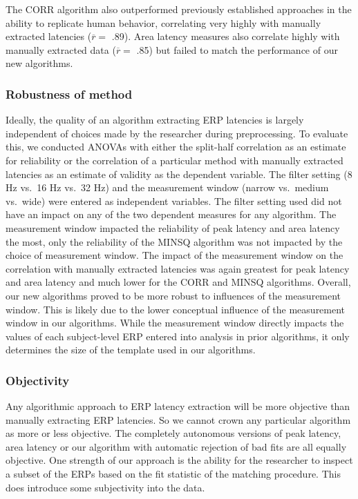 \documentclass[
  man,floatsintext]{apa7}
\begin{document}
The CORR algorithm also outperformed previously established approaches in the ability to replicate human behavior, correlating very highly with manually extracted latencies (\(\overline{r} =\) .89). Area latency measures also correlate highly with manually extracted data (\(\overline{r} =\) .85) but failed to match the performance of our new algorithms.

\hypertarget{robustness-of-method}{%
\subsubsection{Robustness of method}\label{robustness-of-method}}

Ideally, the quality of an algorithm extracting ERP latencies is largely independent of choices made by the researcher during preprocessing. To evaluate this, we conducted ANOVAs with either the split-half correlation as an estimate for reliability or the correlation of a particular method with manually extracted latencies as an estimate of validity as the dependent variable. The filter setting (8 Hz vs.~16 Hz vs.~32 Hz) and the measurement window (narrow vs.~medium vs.~wide) were entered as independent variables. The filter setting used did not have an impact on any of the two dependent measures for any algorithm. The measurement window impacted the reliability of peak latency and area latency the most, only the reliability of the MINSQ algorithm was not impacted by the choice of measurement window. The impact of the measurement window on the correlation with manually extracted latencies was again greatest for peak latency and area latency and much lower for the CORR and MINSQ algorithms. Overall, our new algorithms proved to be more robust to influences of the measurement window. This is likely due to the lower conceptual influence of the measurement window in our algorithms. While the measurement window directly impacts the values of each subject-level ERP entered into analysis in prior algorithms, it only determines the size of the template used in our algorithms.

\hypertarget{objectivity}{%
\subsubsection{Objectivity}\label{objectivity}}

Any algorithmic approach to ERP latency extraction will be more objective than manually extracting ERP latencies. So we cannot crown any particular algorithm as more or less objective. The completely autonomous versions of peak latency, area latency or our algorithm with automatic rejection of bad fits are all equally objective. One strength of our approach is the ability for the researcher to inspect a subset of the ERPs based on the fit statistic of the matching procedure. This does introduce some subjectivity into the data.
\end{document}
